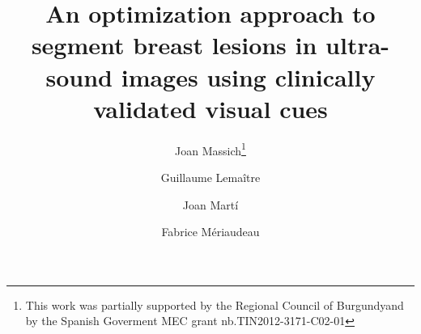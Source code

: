 \title{ An optimization approach to segment breast lesions in ultra-sound images using clinically validated visual cues }
%
\author{
  Joan Massich\thanks{This work was partially supported by the Regional 
                      Council of Burgundyand by the Spanish Goverment MEC 
                      grant nb.TIN2012-3171-C02-01} 
  \and Guillaume Lema\^{i}tre
  \and Joan Mart\'{i}
  \and Fabrice M\'{eriaudeau}
}
%
%
%
